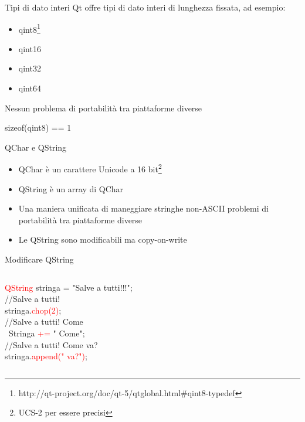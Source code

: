 \documentclass[10pt]{beamer}
\begin{document}
\begin{frame}{Tipi di dato interi}
	Qt offre tipi di dato interi di lunghezza fissata, ad esempio:
	\begin{itemize}
		\item qint8\footnote{http://qt-project.org/doc/qt-5/qtglobal.html\#qint8-typedef}
		\item qint16
		\item qint32
		\item qint64
	\end{itemize}
	Nessun problema di portabilità tra piattaforme diverse
	\begin{block}{}
		\centering
		{\ttfamily sizeof(qint8) == 1}
	\end{block}
\end{frame}

\begin{frame}{QChar e QString}
	\begin{itemize}
		\item QChar è un carattere Unicode a 16 bit\footnote{UCS-2 per essere precisi}
		\item QString è un array di QChar
		\item Una maniera unificata di maneggiare stringhe non-ASCII
		problemi di portabilità tra piattaforme diverse
		\item Le QString sono modificabili ma copy-on-write
	\end{itemize}	
\end{frame}

\begin{frame}{Modificare QString}
	\begin{columns}
		\begin{block}{}
			{\ttfamily \textcolor{red}{QString} stringa = "Salve a tutti!!!";\\
				\bigskip
				//Salve a tutti!\\
				stringa.\textcolor{red}{chop(2)};\\
				\bigskip
				//Salve a tutti! Come\\\
				Stringa \textcolor{red}{+=} " Come";\\
				\bigskip
				//Salve a tutti! Come va?\\
				stringa.\textcolor{red}{append(" va?")};}
		\end{block}
	\end{columns}
\end{frame}
\end{document}
